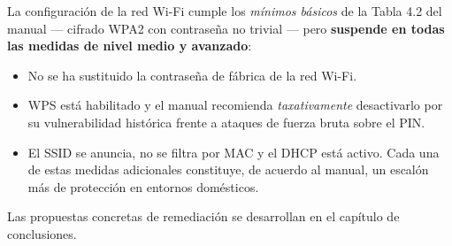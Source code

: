 La configuración de la red Wi-Fi cumple los \textit{mínimos básicos} de la Tabla 4.2 del manual --- cifrado WPA2 con contraseña no trivial --- pero \textbf{suspende en todas las medidas de nivel medio y avanzado}:

\begin{itemize}[leftmargin=*]
    \item No se ha sustituido la contraseña de fábrica de la red Wi-Fi.
    \item WPS está habilitado y el manual recomienda \textit{taxativamente} desactivarlo por su vulnerabilidad histórica frente a ataques de fuerza bruta sobre el PIN.
    \item El SSID se anuncia, no se filtra por MAC y el DHCP está activo. Cada una de estas medidas adicionales constituye, de acuerdo al manual, un escalón más de protección en entornos domésticos.
\end{itemize}

Las propuestas concretas de remediación se desarrollan en el capítulo de conclusiones.
